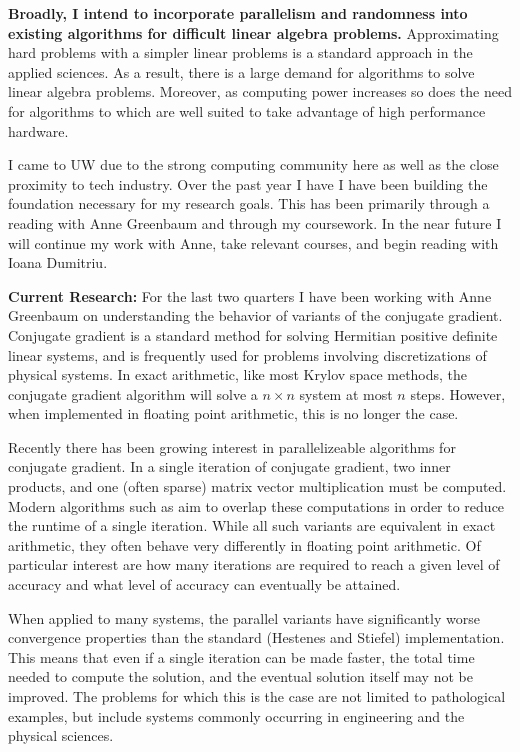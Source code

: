 \documentclass[11pt]{article}
\begin{document}
\maketitle
\vspace{2em}

\textbf{Broadly, I intend to incorporate parallelism and randomness into existing algorithms for difficult linear algebra problems.}
Approximating hard problems with a simpler linear problems is a standard approach in the applied sciences. As a result, there is a large demand for algorithms to solve linear algebra problems. Moreover, as computing power increases so does the need for algorithms to which are well suited to take advantage of high performance hardware.

I came to UW due to the strong computing community here as well as the close proximity to tech industry. Over the past year I have I have been building the foundation necessary for my research goals. This has been primarily through a reading with Anne Greenbaum and through my coursework. In the near future I will continue my work with Anne, take relevant courses, and begin reading with Ioana Dumitriu. 

\textbf{Current Research:}
For the last two quarters I have been working with Anne Greenbaum on understanding the behavior of variants of the conjugate gradient. 
Conjugate gradient is a standard method for solving Hermitian positive definite linear systems, and is frequently used for problems involving discretizations of physical systems. In exact arithmetic, like most Krylov space methods, the conjugate gradient algorithm will solve a \( n\times n \) system at most \( n \) steps. However, when implemented in floating point arithmetic, this is no longer the case.

Recently there has been growing interest in parallelizeable algorithms for conjugate gradient. In a single iteration of conjugate gradient, two inner products, and one (often sparse) matrix vector multiplication must be computed. Modern algorithms such as \cite{CGCG, pCG} aim to overlap these computations in order to reduce the runtime of a single iteration.
While all such variants are equivalent in exact arithmetic, they often behave very differently in floating point arithmetic. Of particular interest are how many iterations are required to reach a given level of accuracy and what level of accuracy can eventually be attained.

When applied to many systems, the parallel variants have significantly worse convergence properties than the standard (Hestenes and Stiefel) implementation. 
This means that even if a single iteration can be made faster, the total time needed to compute the solution, and the eventual solution itself may not be improved. The problems for which this is the case are not limited to pathological examples, but include systems commonly occurring in engineering and the physical sciences.
\end{document}
